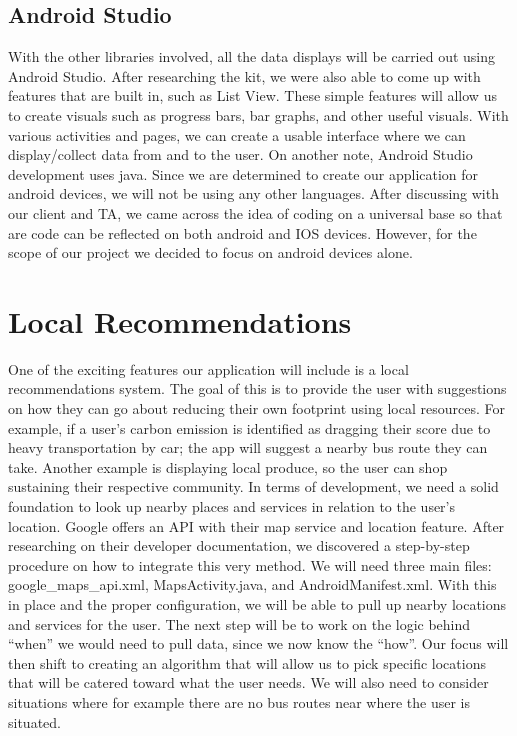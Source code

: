 \documentclass[onecolumn, draftclsnofoot,10pt, compsoc, tikz]{IEEEtran}
\begin{document}
\subsection{Android Studio}
With the other libraries involved, all the data displays will be carried out using Android Studio. After researching the kit, we were also able to come up with features that are built in, such as List View. These simple features will allow us to create visuals such as progress bars, bar graphs, and other useful visuals. With various activities and pages, we can create a usable interface where we can display/collect data from and to the user. On another note, Android Studio development uses java. Since we are determined to create our application for android devices, we will not be using any other languages. After discussing with our client and TA, we came across the idea of coding on a universal base so that are code can be reflected on both android and IOS devices. However, for the scope of our project we decided to focus on android devices alone.

\clearpage
\section{Local Recommendations}
One of the exciting features our application will include is a local recommendations system. The goal of this is to provide the user with suggestions on how they can go about reducing their own footprint using local resources. For example, if a user’s carbon emission is identified as dragging their score due to heavy transportation by car; the app will suggest a nearby bus route they can take. Another example is displaying local produce, so the user can shop sustaining their respective community. In terms of development, we need a solid foundation to look up nearby places and services in relation to the user’s location. Google offers an API with their map service and location feature. After researching on their developer documentation, we discovered a step-by-step procedure on how to integrate this very method. We will need three main files: google\_maps\_api.xml, MapsActivity.java, and AndroidManifest.xml\cite{4}. With this in place and the proper configuration, we will be able to pull up nearby locations and services for the user. The next step will be to work on the logic behind “when” we would need to pull data, since we now know the “how”. Our focus will then shift to creating an algorithm that will allow us to pick specific locations that will be catered toward what the user needs. We will also need to consider situations where for example there are no bus routes near where the user is situated.
\end{document}
